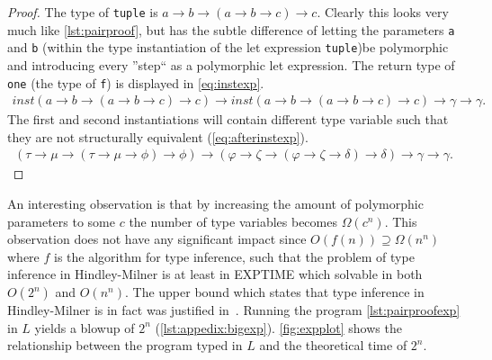 \documentclass[11pt,oneside,a4paper]{report}
\begin{document}
\begin{proof}
    The type of \texttt{tuple} is $a \rightarrow b \rightarrow (a \rightarrow b \rightarrow c) \rightarrow c$.
    Clearly this looks very much like \autoref{lst:pairproof}, but has the subtle difference of letting the parameters \texttt{a} and \texttt{b} (within the type instantiation of the let expression \texttt{tuple})be polymorphic and introducing every ''step`` as a polymorphic let expression.
    The return type of \texttt{one} (the type of \texttt{f}) is displayed in \autoref{eq:instexp}.
    \begin{align}
        \textit{inst}(a \rightarrow b \rightarrow (a \rightarrow b \rightarrow c) \rightarrow c) \rightarrow \textit{inst}(a \rightarrow b \rightarrow (a \rightarrow b \rightarrow c) \rightarrow c) \rightarrow \gamma \rightarrow \gamma.
        \label{eq:instexp}
    \end{align}
    The first and second instantiations will contain different type variable such that they are not structurally equivalent (\autoref{eq:afterinstexp}).
    \begin{align}
        (\tau \rightarrow \mu \rightarrow (\tau \rightarrow \mu \rightarrow \phi) \rightarrow \phi) \rightarrow (\varphi \rightarrow \zeta \rightarrow (\varphi \rightarrow \zeta \rightarrow \delta) \rightarrow \delta) \rightarrow \gamma \rightarrow \gamma.
        \label{eq:afterinstexp}
    \end{align}
\end{proof}
An interesting observation is that by increasing the amount of polymorphic parameters to some $c$ the number of type variables becomes $\Omega(c^n)$.
This observation does not have any significant impact since $O(f(n)) \supseteq \Omega(n^n)$ where $f$ is the algorithm for type inference, such that the problem of type inference in Hindley-Milner is at least in EXPTIME which solvable in both $O(2^n)$ and $O(n^n)$.
The upper bound which states that type inference in Hindley-Milner is in fact  was justified in~\cite{kfoury1990ml,mairson1989deciding}.
Running the program \autoref{lst:pairproofexp} in $L$ yields a blowup of $2^n$ (\autoref{lst:appedix:bigexp}).
\autoref{fig:expplot} shows the relationship between the program typed in $L$ and the theoretical time of $2^n$.
\end{document}
